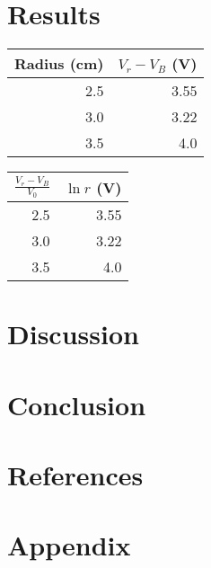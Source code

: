 \documentclass[12pt]{article}
\begin{document}
\section{Results}
\begin{center}
\begin{tabular}{ |r|r| }
    \hline
    Radius (cm) & $V_r - V_B$ (V) \\ \hline
    2.5 & 3.55\\
    3.0 & 3.22\\
    3.5 & 4.0\\
    \hline
\end{tabular}
\begin{tabular}{ |r|r| }
    \hline
    $\frac{V_r-V_B}{V_0}$ & $\ln r$ (V) \\ \hline
    2.5 & 3.55\\
    3.0 & 3.22\\
    3.5 & 4.0\\
    \hline
\end{tabular}
\end{center}

  
\section{Discussion}
\section{Conclusion}
\pagebreak
\section*{References}
\pagebreak
\section*{Appendix}
\end{document}
